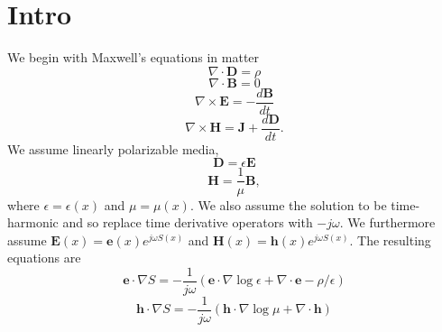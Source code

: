 \documentclass{article}
\theoremstyle{plain}
\begin{document}
\section{Intro}\label{sec:intro}

We begin with Maxwell's equations in matter
\begin{equation}
	\nabla\cdot\mathbf{D} = \rho
\end{equation}
\begin{equation}
	\nabla\cdot\mathbf{B} = 0
\end{equation}
\begin{equation}
	\nabla\times\mathbf{E} = -\frac{d\mathbf{B}}{dt}
\end{equation}
\begin{equation}
	\nabla\times\mathbf{H} = \mathbf{J} + \frac{d\mathbf{D}}{dt}.
\end{equation}
We assume linearly polarizable media,
\begin{equation}
	\mathbf{D} = \epsilon\mathbf{E}
\end{equation}
\begin{equation}
	\mathbf{H} = \frac{1}{\mu}\mathbf{B},
\end{equation}
where $\epsilon=\epsilon(x)$ and $\mu=\mu(x)$. We also assume the solution to be time-harmonic and so replace time derivative operators with $-j\omega$. We furthermore assume $\mathbf{E}(x) = \mathbf{e}(x)e^{j\omega S(x)}$ and $\mathbf{H}(x) = \mathbf{h}(x)e^{j\omega S(x)}$. The resulting equations are
\begin{equation}\label{eq:max1}
	\mathbf{e}\cdot\nabla S = -\frac{1}{j\omega}\left( \mathbf{e}\cdot\nabla\log{\epsilon} + \nabla\cdot\mathbf{e}-\rho/\epsilon \right)
\end{equation}
\begin{equation}\label{eq:max2}
	\mathbf{h}\cdot\nabla S = -\frac{1}{j\omega}\left( \mathbf{h}\cdot\nabla\log{\mu} + \nabla\cdot\mathbf{h}\right)
\end{equation}
\end{document}
